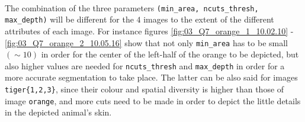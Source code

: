 \noindent{}\\


The combination of the three parameters
\texttt{(min\_area, ncuts\_thresh, max\_depth)} will be different for the $4$
images to the extent of the different attributes of each image. For instance
figures \ref{fig:03_Q7_orange_1_10.02.10} - \ref{fig:03_Q7_orange_2_10.05.16}
show that not only \texttt{min\_area} has to be small $(\sim 10)$ in order
for the center of the left-half of the orange to be depicted, but also higher
values are needed for \texttt{ncuts\_thresh} and \texttt{max\_depth} in order
for a more accurate segmentation to take place. The latter can be also said
for images \texttt{tiger\{1,2,3\}}, since their colour and spatial diversity
is higher than those of image \texttt{orange}, and more cuts need to be made
in order to depict the little details in the depicted animal's skin.


